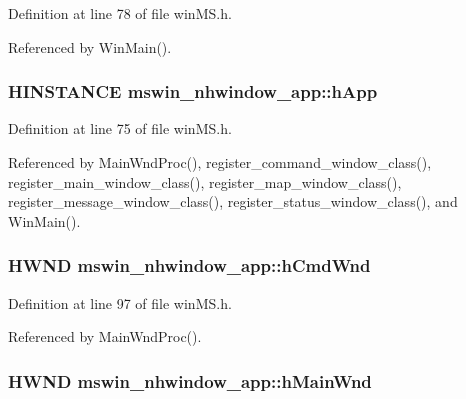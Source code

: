 Definition at line 78 of file win\+M\+S.\+h.



Referenced by Win\+Main().

\hypertarget{structmswin__nhwindow__app_ae3a365ad66195c8e1d915242897c3f24}{
\subsubsection[{h\+App}]{\setlength{\rightskip}{0pt plus 5cm}H\+I\+N\+S\+T\+A\+N\+C\+E mswin\+\_\+nhwindow\+\_\+app\+::h\+App}}\label{structmswin__nhwindow__app_ae3a365ad66195c8e1d915242897c3f24}


Definition at line 75 of file win\+M\+S.\+h.



Referenced by Main\+Wnd\+Proc(), register\+\_\+command\+\_\+window\+\_\+class(), register\+\_\+main\+\_\+window\+\_\+class(), register\+\_\+map\+\_\+window\+\_\+class(), register\+\_\+message\+\_\+window\+\_\+class(), register\+\_\+status\+\_\+window\+\_\+class(), and Win\+Main().

\hypertarget{structmswin__nhwindow__app_add8def82fb90c4305efcbc002d0f61e2}{
\subsubsection[{h\+Cmd\+Wnd}]{\setlength{\rightskip}{0pt plus 5cm}H\+W\+N\+D mswin\+\_\+nhwindow\+\_\+app\+::h\+Cmd\+Wnd}}\label{structmswin__nhwindow__app_add8def82fb90c4305efcbc002d0f61e2}


Definition at line 97 of file win\+M\+S.\+h.



Referenced by Main\+Wnd\+Proc().

\hypertarget{structmswin__nhwindow__app_ada318d77e9dd51678af5d9a3ce6ef03a}{
\subsubsection[{h\+Main\+Wnd}]{\setlength{\rightskip}{0pt plus 5cm}H\+W\+N\+D mswin\+\_\+nhwindow\+\_\+app\+::h\+Main\+Wnd}}\label{structmswin__nhwindow__app_ada318d77e9dd51678af5d9a3ce6ef03a}


